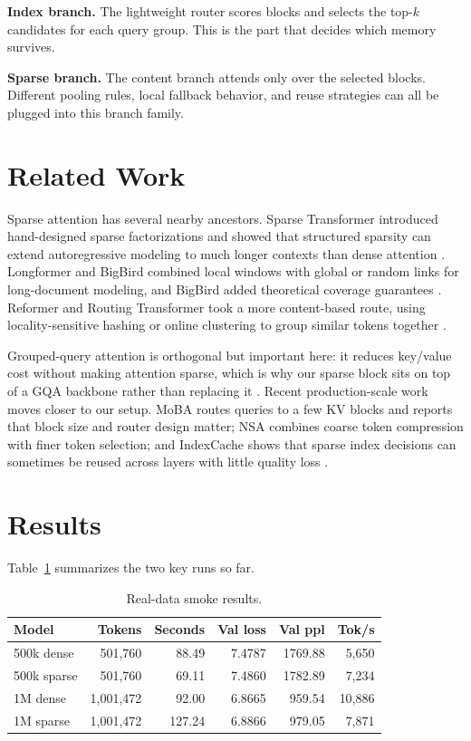 \documentclass[11pt]{article}
\begin{document}
\textbf{Index branch.} The lightweight router scores blocks and selects the top-$k$ candidates for each query group. This is the part that decides which memory survives.

\textbf{Sparse branch.} The content branch attends only over the selected blocks. Different pooling rules, local fallback behavior, and reuse strategies can all be plugged into this branch family.

\section{Related Work}
Sparse attention has several nearby ancestors. Sparse Transformer introduced hand-designed sparse factorizations and showed that structured sparsity can extend autoregressive modeling to much longer contexts than dense attention \cite{child2019sparse}. Longformer and BigBird combined local windows with global or random links for long-document modeling, and BigBird added theoretical coverage guarantees \cite{longformer2020,bigbird2020}. Reformer and Routing Transformer took a more content-based route, using locality-sensitive hashing or online clustering to group similar tokens together \cite{reformer2020,routing2020}.

Grouped-query attention is orthogonal but important here: it reduces key/value cost without making attention sparse, which is why our sparse block sits on top of a GQA backbone rather than replacing it \cite{gqa2023}. Recent production-scale work moves closer to our setup. MoBA routes queries to a few KV blocks and reports that block size and router design matter; NSA combines coarse token compression with finer token selection; and IndexCache shows that sparse index decisions can sometimes be reused across layers with little quality loss \cite{moba2025,nsa2025,indexcache2026}.

\section{Results}
Table~\ref{tab:main} summarizes the two key runs so far.

\begin{table}[h]
\centering
\caption{Real-data smoke results.}
\label{tab:main}
\begin{tabular}{lrrrrr}
\toprule
Model & Tokens & Seconds & Val loss & Val ppl & Tok/s \\
\midrule
500k dense & 501,760 & 88.49 & 7.4787 & 1769.88 & 5,650 \\
500k sparse & 501,760 & 69.11 & 7.4860 & 1782.89 & 7,234 \\
1M dense & 1,001,472 & 92.00 & 6.8665 & 959.54 & 10,886 \\
1M sparse & 1,001,472 & 127.24 & 6.8866 & 979.05 & 7,871 \\
\bottomrule
\end{tabular}
\end{table}
\end{document}
